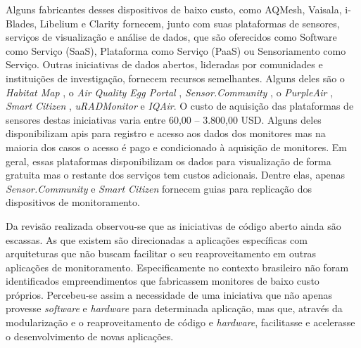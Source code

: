 Alguns fabricantes desses dispositivos de baixo custo, como AQMesh, Vaisala, i-Blades, Libelium e Clarity fornecem, junto com suas plataformas de sensores, serviços de visualização e análise de dados, que são oferecidos como Software como Serviço (SaaS), Plataforma como Serviço (PaaS) ou Sensoriamento como Serviço. Outras iniciativas de dados abertos, lideradas por comunidades e instituições de investigação, fornecem recursos semelhantes. Alguns deles são o \textit{Habitat Map} \cite{HabitatMap2023AirCasting}, o \textit{Air Quality Egg Portal} \cite{AirQualityEgg2023AirPortal}, \textit{Sensor.Community} \cite{Sensor.Community2023LuftMap}, o \textit{PurpleAir} \cite{PurpleAir2023PurpleAirMonitoring}, \textit{Smart Citizen} \cite{SmartCitizen2023SmartCitizen}, \textit{uRADMonitor} \cite{uRADMonitor2023PM2.5URADMonitor} e \textit{IQAir}. O custo de aquisição das plataformas de sensores destas iniciativas varia entre 60,00 – 3.800,00 USD. Alguns deles disponibilizam \acrshort{api}s para registro e acesso aos dados dos monitores mas na maioria dos casos o acesso é pago e condicionado à aquisição de monitores. Em geral, essas plataformas disponibilizam os dados para visualização de forma gratuita mas o restante dos serviços tem custos adicionais. Dentre elas, apenas \textit{Sensor.Community} e \textit{Smart Citizen} fornecem guias para replicação dos dispositivos de monitoramento. 

Da revisão realizada observou-se que as iniciativas de código aberto ainda são escassas. As que existem são direcionadas a aplicações específicas com arquiteturas que não buscam facilitar o seu reaproveitamento em outras aplicações de monitoramento. Especificamente no contexto brasileiro não foram identificados empreendimentos que fabricassem monitores de baixo custo próprios. Percebeu-se assim a necessidade de uma iniciativa que não apenas provesse \textit{software} e \textit{hardware} para determinada aplicação, mas que, através da modularização e o reaproveitamento de código e \textit{hardware}, facilitasse e acelerasse o desenvolvimento de novas aplicações.

